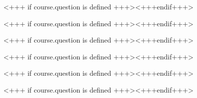 \documentclass[english,xcolor=pdftex,dvipsnames]{beamer}
\begin{document}

<+++ if course.question is defined +++><+++endif+++> 


<+++ if course.question is defined +++><+++endif+++>


<+++ if course.question is defined +++><+++endif+++>
      

%

%

%


<+++ if course.question is defined +++><+++endif+++>


<+++ if course.question is defined +++><+++endif+++>


<+++ if course.question is defined +++><+++endif+++>



%
\end{document}
